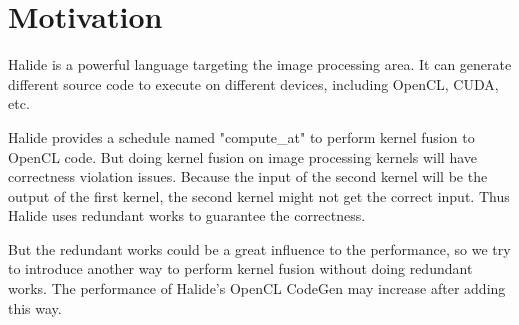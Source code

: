 \chapter{Motivation}

    Halide is a powerful language targeting the image processing area. It can generate different source code to execute on different devices, including OpenCL, CUDA, etc.

    Halide provides a schedule named "compute\_at" to perform kernel fusion to OpenCL code. But doing kernel fusion on image processing kernels will have correctness violation issues. Because the input of the second kernel will be the output of the first kernel, the second kernel might not get the correct input. Thus Halide uses redundant works to guarantee the correctness.
    
    But the redundant works could be a great influence to the performance, so we try to introduce another way to perform kernel fusion without doing redundant works. The performance of Halide's OpenCL CodeGen may increase after adding this way.
